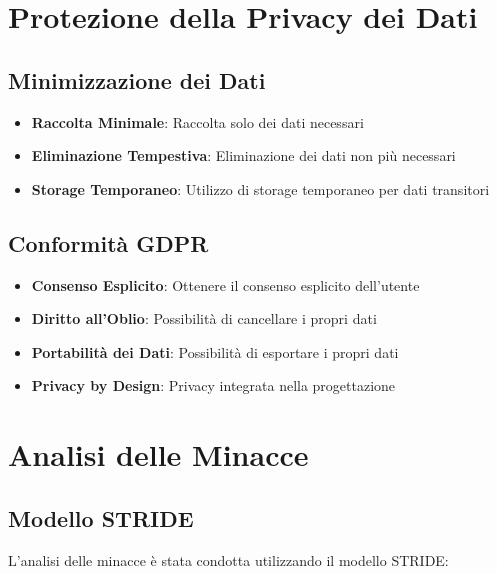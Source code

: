 \section{Protezione della Privacy dei Dati}

\subsection{Minimizzazione dei Dati}
\begin{itemize}
    \item \textbf{Raccolta Minimale}: Raccolta solo dei dati necessari
    \item \textbf{Eliminazione Tempestiva}: Eliminazione dei dati non più necessari
    \item \textbf{Storage Temporaneo}: Utilizzo di storage temporaneo per dati transitori
\end{itemize}

\subsection{Conformità GDPR}
\begin{itemize}
    \item \textbf{Consenso Esplicito}: Ottenere il consenso esplicito dell'utente
    \item \textbf{Diritto all'Oblio}: Possibilità di cancellare i propri dati
    \item \textbf{Portabilità dei Dati}: Possibilità di esportare i propri dati
    \item \textbf{Privacy by Design}: Privacy integrata nella progettazione
\end{itemize}

\section{Analisi delle Minacce}

\subsection{Modello STRIDE}
L'analisi delle minacce è stata condotta utilizzando il modello STRIDE:

